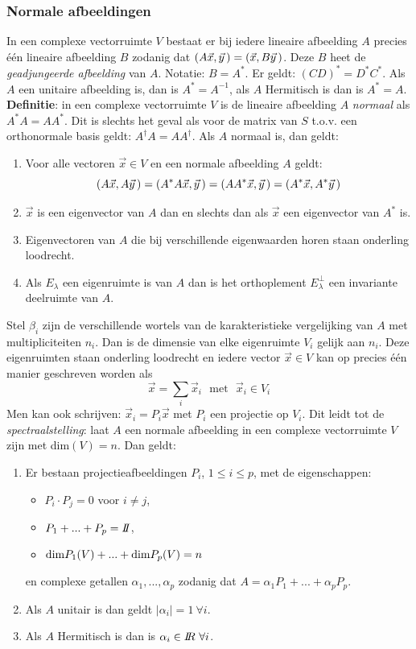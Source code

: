 \documentclass[twoside]{report}
\begin{document}
\subsubsection{Normale afbeeldingen}
In een complexe vectorruimte $V$ bestaat er bij iedere lineaire afbeelding $A$
precies \'e\'en lineaire afbeelding $B$ zodanig dat $(A\vec{x},\vec{y}\,)=(\vec{x},B\vec{y}\,)$.
Deze $B$ heet de {\it geadjungeerde afbeelding} van $A$. Notatie: $B=A^*$. Er
geldt: $(CD)^*=D^*C^*$. Als $A$ een unitaire afbeelding is, dan is $A^*=A^{-1}$,
als $A$ Hermitisch is dan is $A^*=A$.
\npar
{\bf Definitie}: in een complexe vectorruimte $V$ is de lineaire afbeelding
$A$ {\it normaal} als $A^*A=AA^*$. Dit is slechts het geval als voor de matrix
van $S$ t.o.v. een orthonormale basis geldt: $A^\dagger A=AA^\dagger$.
\npar
Als $A$ normaal is, dan geldt:
\begin{enumerate}
\item Voor alle vectoren $\vec{x}\in V$ en een normale afbeelding $A$ geldt:
\[
(A\vec{x},A\vec{y}\,)=(A^*A\vec{x},\vec{y}\,)=(AA^*\vec{x},\vec{y}\,)=(A^*\vec{x},A^*\vec{y}\,)
\]
\item $\vec{x}$ is een eigenvector van $A$ dan en slechts dan als $\vec{x}$ een
      eigenvector van $A^*$ is.
\item Eigenvectoren van $A$ die bij verschillende eigenwaarden horen staan
      onderling loodrecht.
\item Als $E_\lambda$ een eigenruimte is van $A$ dan is het orthoplement
      $E_\lambda^\perp$ een invariante deelruimte van $A$.
\end{enumerate}
Stel $\beta_i$ zijn de verschillende wortels van de karakteristieke vergelijking van
$A$ met multipliciteiten $n_i$. Dan is de dimensie van elke eigenruimte $V_i$
gelijk aan $n_i$. Deze eigenruimten staan onderling loodrecht en iedere vector
$\vec{x}\in V$ kan op precies \'e\'en manier geschreven worden als
\[
\vec{x}=\sum_i\vec{x}_i~~~\mbox{met}~~~\vec{x}_i\in V_i
\]
Men kan ook schrijven: $\vec{x}_i=P_i\vec{x}$ met $P_i$ een projectie op $V_i$.
Dit leidt tot de {\it spectraalstelling}: laat $A$ een normale afbeelding in
een complexe vectorruimte $V$ zijn met dim$(V)=n$. Dan geldt:
\begin{enumerate}
\item Er bestaan projectieafbeeldingen $P_i$, $1\leq i\leq p$, met de
      eigenschappen:
      \begin{itemize}
      \item $P_i\cdot P_j=0$ voor $i\neq j$,
      \item $P_1+...+P_p=I\hspace{-1mm}I$,
      \item ${\rm dim}P_1(V)+...+{\rm dim}P_p(V)=n$
      \end{itemize}
      en complexe getallen $\alpha_1,...,\alpha_p$ zodanig dat
      $A=\alpha_1P_1+...+\alpha_pP_p$.
\item Als $A$ unitair is dan geldt $|\alpha_i|=1~\forall i$.
\item Als $A$ Hermitisch is dan is $\alpha_i\in I\hspace{-1mm}R~\forall i$.
\end{enumerate}
\end{document}

